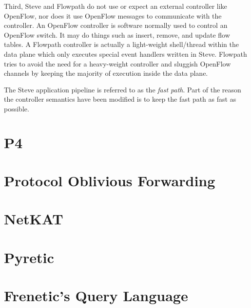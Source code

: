 Third, Steve and Flowpath do not use or expect an external controller like OpenFlow, nor does it use OpenFlow messages to communicate with the controller. An OpenFlow controller is software normally used to control an OpenFlow switch. It may do things such as insert, remove, and update flow tables. A Flowpath controller is actually a light-weight shell/thread within the data plane which only executes special event handlers written in Steve. Flowpath tries to avoid the need for a heavy-weight controller and sluggish OpenFlow channels by keeping the majority of execution inside the data plane.

The Steve application pipeline is referred to as the \textit{fast path}. Part of the reason the controller semantics have been modified is to keep the fast path as fast as possible.

\section{P4} \label{rel:p4}

\section{Protocol Oblivious Forwarding} \label{rel:pof}

\section{NetKAT} \label{rel:netkat}

\section{Pyretic} \label{rel:netkat}

\section{Frenetic's Query Language} \label{rel:netkat}